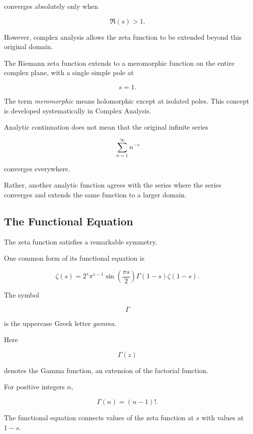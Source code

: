 converges absolutely only when

\[ \Re(s)>1. \]

However, complex analysis allows the zeta function to be extended beyond
this original domain.

\begin{theorem}
The Riemann zeta function extends to a meromorphic function on the entire
complex plane, with a single simple pole at

\[ s=1. \]
\end{theorem}

The term \emph{meromorphic} means holomorphic except at isolated poles. This
concept is developed systematically in Complex Analysis.

\begin{warningbox}
Analytic continuation does not mean that the original infinite series

\[ \sum_{n=1}^{\infty}n^{-s} \]

converges everywhere.

Rather, another analytic function agrees with the series where the series
converges and extends the same function to a larger domain.
\end{warningbox}

\subsection{The Functional Equation}
\label{subsec:zeta-functional-equation}

The zeta function satisfies a remarkable symmetry.

One common form of its functional equation is

\[
\boxed{
\zeta(s)
=
2^s\pi^{s-1}
\sin\left(\frac{\pi s}{2}\right)
\Gamma(1-s)
\zeta(1-s).
}
\]

The symbol

\[ \Gamma \]

is the uppercase Greek letter \emph{gamma}.

Here

\[ \Gamma(z) \]

denotes the Gamma function, an extension of the factorial function.

For positive integers \(n\),

\[ \Gamma(n)=(n-1)!. \]

The functional equation connects values of the zeta function at \(s\) with
values at \(1-s\).

